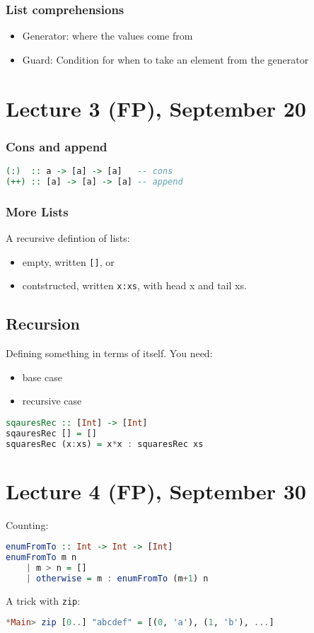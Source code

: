 \documentclass{article}
\begin{document}
\subsubsection{List comprehensions}
\begin{itemize}
    \item Generator: where the values come from
    \item Guard: Condition for when to take an element from the generator
\end{itemize}
\section{Lecture 3 (FP), September 20}
\subsubsection{Cons and append}
\begin{lstlisting}[language=haskell]
(:)  :: a -> [a] -> [a]   -- cons
(++) :: [a] -> [a] -> [a] -- append
\end{lstlisting}
\subsubsection{More Lists}
A recursive defintion of lists:
\begin{itemize}
    \item empty, written \texttt{[]}, or
    \item contstructed, written \texttt{x:xs}, with head x and tail xs.
\end{itemize}
\subsection{Recursion}
Defining something in terms of itself.
You need:
\begin{itemize}
    \item base case
    \item recursive case
\end{itemize}
\begin{lstlisting}[language=haskell]
sqauresRec :: [Int] -> [Int]
sqauresRec [] = []
squaresRec (x:xs) = x*x : squaresRec xs
\end{lstlisting}
\section{Lecture 4 (FP), September 30}
Counting:
\begin{lstlisting}[language=haskell]
enumFromTo :: Int -> Int -> [Int]
enumFromTo m n
    | m > n = []
    | otherwise = m : enumFromTo (m+1) n
\end{lstlisting}
A trick with \texttt{zip}:
\begin{lstlisting}[language=haskell]
*Main> zip [0..] "abcdef" = [(0, 'a'), (1, 'b'), ...]
\end{lstlisting}
\end{document}
